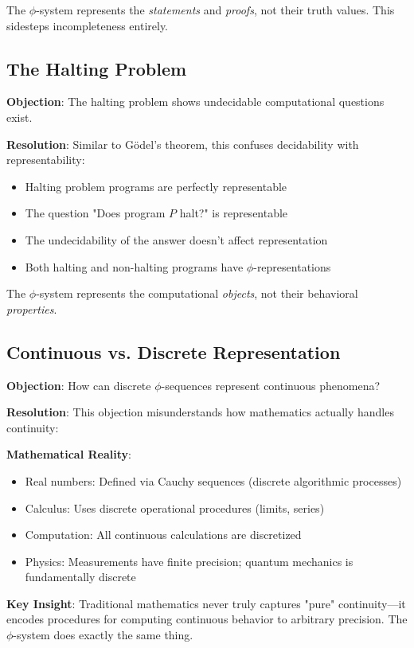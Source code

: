 \documentclass[12pt,letterpaper]{article}
\begin{document}
The $\phi$-system represents the \textit{statements} and \textit{proofs}, not their truth values. This sidesteps incompleteness entirely.

\subsection{The Halting Problem}

\textbf{Objection}: The halting problem shows undecidable computational questions exist.

\textbf{Resolution}: Similar to Gödel's theorem, this confuses decidability with representability:

\begin{itemize}
\item Halting problem programs are perfectly representable
\item The question "Does program $P$ halt?" is representable
\item The undecidability of the answer doesn't affect representation
\item Both halting and non-halting programs have $\phi$-representations
\end{itemize}

The $\phi$-system represents the computational \textit{objects}, not their behavioral \textit{properties}.

\subsection{Continuous vs. Discrete Representation}

\textbf{Objection}: How can discrete $\phi$-sequences represent continuous phenomena?

\textbf{Resolution}: This objection misunderstands how mathematics actually handles continuity:

\textbf{Mathematical Reality}:
\begin{itemize}
\item Real numbers: Defined via Cauchy sequences (discrete algorithmic processes)
\item Calculus: Uses discrete operational procedures (limits, series)
\item Computation: All continuous calculations are discretized
\item Physics: Measurements have finite precision; quantum mechanics is fundamentally discrete
\end{itemize}

\textbf{Key Insight}: Traditional mathematics never truly captures "pure" continuity—it encodes procedures for computing continuous behavior to arbitrary precision. The $\phi$-system does exactly the same thing.
\end{document}
